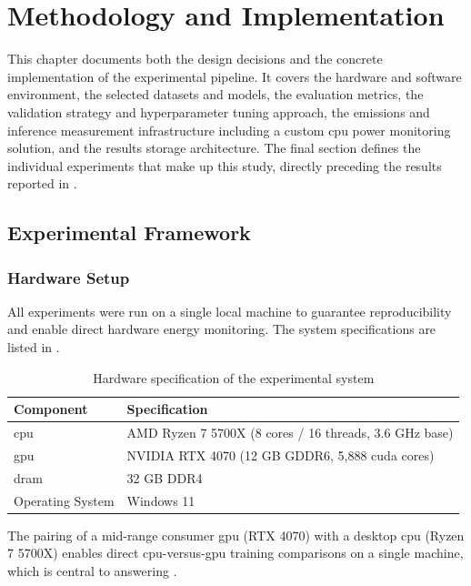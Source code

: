 \chapter{Methodology and Implementation}
\label{experimental_design}

This chapter documents both the design decisions and the concrete implementation of the experimental pipeline. It covers the hardware and software environment, the selected datasets and models, the evaluation metrics, the validation strategy and hyperparameter tuning approach, the emissions and inference measurement infrastructure including a custom \gls{cpu} power monitoring solution, and the results storage architecture. The final section defines the individual experiments that make up this study, directly preceding the results reported in .

\section{Experimental Framework}

\subsection{Hardware Setup}
\label{sec:implementation_hardware}

All experiments were run on a single local machine to guarantee reproducibility and enable direct hardware energy monitoring. The system specifications are listed in .

\begin{table}[htbp]
\centering
\caption{Hardware specification of the experimental system}
\label{tab:hardware}
\begin{tabular}{ll}
\toprule
\textbf{Component} & \textbf{Specification} \\
\midrule
\gls{cpu} & AMD Ryzen 7 5700X (8 cores / 16 threads, 3.6 GHz base) \\
\gls{gpu} & NVIDIA RTX 4070 (12 GB GDDR6, 5{,}888 \acrshort{cuda} cores) \\
\gls{dram} & 32 GB DDR4 \\
Operating System & Windows 11 \\
\bottomrule
\end{tabular}
\end{table}

The pairing of a mid-range consumer \gls{gpu} (RTX 4070) with a desktop \gls{cpu} (Ryzen 7 5700X) enables direct \gls{cpu}-versus-\gls{gpu} training comparisons on a single machine, which is central to answering .

